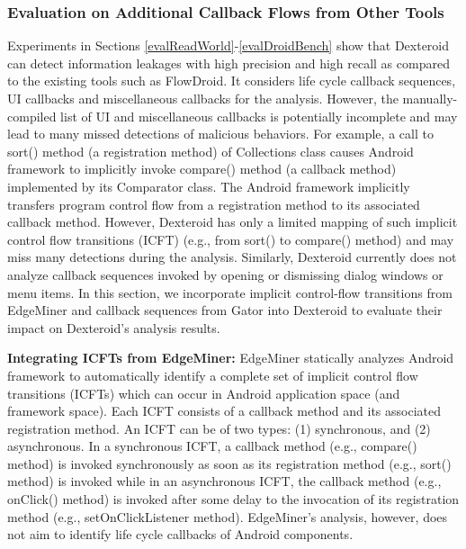 \documentclass[10pt]{elsarticle}
\begin{document}
\subsubsection{Evaluation on Additional Callback Flows from Other Tools}  \label{EdgeMinerGator}
 

Experiments in Sections \ref{evalReadWorld}-\ref{evalDroidBench} show that Dexteroid can detect information leakages with high precision and high recall as compared to the existing tools such as FlowDroid. It considers life cycle callback sequences, UI callbacks and miscellaneous callbacks for the analysis. However, the manually-compiled list of UI and miscellaneous callbacks is potentially incomplete and may lead to many missed detections of malicious behaviors. For example, a call to {\ttfamily sort()} method (a registration method) of {\ttfamily Collections} class causes Android framework to implicitly invoke {\ttfamily compare()} method (a callback method) implemented by its {\ttfamily Comparator} class. The Android framework implicitly transfers program control flow from a registration method to its associated callback method. However, Dexteroid has only a limited mapping of such implicit control flow transitions (ICFT) (e.g., from {\ttfamily sort()} to {\ttfamily compare()} method) and may miss many detections during the analysis. Similarly, Dexteroid currently does not analyze callback sequences invoked by opening or dismissing dialog windows or menu items. In this section, we incorporate implicit control-flow transitions from EdgeMiner \cite{EdgeMiner} and callback sequences from Gator \cite{GATORWTG} into Dexteroid to evaluate their impact on Dexteroid's analysis results.

{\noindent \bf Integrating ICFTs from EdgeMiner:} EdgeMiner \cite{EdgeMiner} statically analyzes Android framework to automatically identify a complete set of implicit control flow transitions (ICFTs) which can occur in Android application space (and framework space). Each ICFT consists of a callback method and its associated registration method. An ICFT can be of two types: (1) synchronous, and (2) asynchronous. In a synchronous ICFT, a callback method (e.g., {\ttfamily compare()} method) is invoked synchronously as soon as its registration method (e.g., {\ttfamily sort()} method) is invoked while in an asynchronous ICFT, the callback method (e.g., {\ttfamily onClick()} method) is invoked after some delay to the invocation of its registration method (e.g., {\ttfamily setOnClickListener} method). EdgeMiner's analysis, however, does not aim to identify life cycle callbacks of Android components.
	
\end{document}
